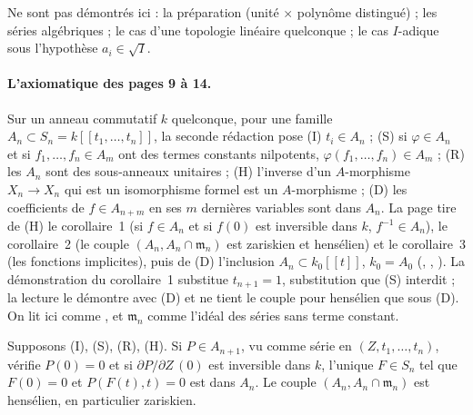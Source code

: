 Ne sont pas démontrés ici : la préparation (unité $\times$ polynôme distingué) ; les séries algébriques ; le cas d'une topologie linéaire quelconque ; le cas $I$-adique sous l'hypothèse $a_i \in \sqrt I$.

\paragraph{L'axiomatique des pages 9 à 14.} Sur un anneau commutatif $k$ quelconque, pour une famille $A_n \subset S_n = k[[t_1, \ldots, t_n]]$, la seconde rédaction pose (I) $t_i \in A_n$ ; (S) si $\varphi \in A_n$ et si $f_1, \ldots, f_n \in A_m$ ont des termes constants nilpotents, $\varphi(f_1, \ldots, f_n) \in A_m$ ; (R) les $A_n$ sont des sous-anneaux unitaires ; (H) l'inverse d'un $A$-morphisme $X_n \to X_n$ qui est un isomorphisme formel est un $A$-morphisme ; (D) les coefficients de $f \in A_{n+m}$ en ses $m$ dernières variables sont dans $A_n$. La page tire de (H) le corollaire~1 (si $f \in A_n$ et si $f(0)$ est inversible dans $k$, $f^{-1} \in A_n$), le corollaire~2 (le couple $(A_n, A_n \cap \mathfrak m_n)$ est zariskien et hensélien) et le corollaire~3 (les fonctions implicites), puis de (D) l'inclusion $A_n \subset k_0[[t]]$, $k_0 = A_0$ (, , ). La démonstration du corollaire~1 substitue $t_{n+1} = 1$, substitution que (S) interdit ; la lecture le démontre avec (D) et ne tient le couple pour hensélien que sous (D). On lit ici  comme , et $\mathfrak m_n$ comme l'idéal des séries sans terme constant.

\begin{encadre}
\begin{theoreme}\label{thm:39-hensel}
Supposons (I), (S), (R), (H). Si $P \in A_{n+1}$, vu comme série en $(Z, t_1, \ldots, t_n)$, vérifie $P(0) = 0$ et si $\partial P/\partial Z\,(0)$ est inversible dans $k$, l'unique $F \in S_n$ tel que $F(0) = 0$ et $P(F(t), t) = 0$ est dans $A_n$. Le couple $(A_n, A_n \cap \mathfrak m_n)$ est hensélien, en particulier zariskien.
\end{theoreme}
\end{encadre}

